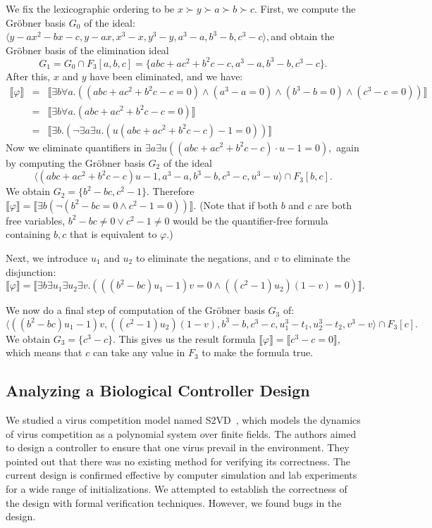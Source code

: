 \documentclass[envcountsect]{llncs}
\begin{document}
{{We fix the lexicographic ordering to be $x\succ y\succ a\succ b\succ c.$ First, we compute the Gr\"obner basis $G_0$ of the ideal: {$\langle y-ax^2-bx-c, y-ax, x^3-x,y^3-y,a^3-a,b^3-b,c^3-c\rangle,$}and obtain the Gr\"obner basis of the elimination ideal { $$G_1= G_0\cap F_3[a,b,c]=\{abc + ac^2 + b^2c - c, a^3-a, b^3 - b, c^3 - c\}.$$}After this, $x$ and $y$ have been eliminated, and we have:
 {\begin{eqnarray*}
\llbracket \varphi \rrbracket &= &\llbracket\exists b\forall a.((abc + ac^2 + b^2c - c=0)\wedge (a^3-a=0) \wedge (b^3 - b=0) \wedge (c^3 - c=0))\rrbracket\\
&=& \llbracket \exists b\forall a.(abc + ac^2 + b^2c - c=0)\rrbracket  \ \ \ \ \ \ \ \\
&=& \llbracket \exists b.(\neg \exists a \exists u.(u(abc + ac^2 + b^2c - c)-1=0))\rrbracket   
 \end{eqnarray*}}Now we eliminate quantifiers in $\exists a \exists u ((abc + ac^2 + b^2c - c)\cdot u-1=0),$ again by computing the Gr\"obner basis $G_2$ of the ideal {$$\langle (abc + ac^2 + b^2c - c)u-1,a^3-a,b^3-b,c^3-c,u^3-u\rangle \cap F_3[b,c].$$} We obtain $G_2=\{ b^2 - bc, c^2 - 1\}$. Therefore 
{$\llbracket \varphi \rrbracket = \llbracket \exists b (\neg (b^2 - bc=0\wedge c^2 - 1=0))\rrbracket$.} (Note that if both $b$ and $c$ are both free variables, $b^2 - bc\neq 0\vee c^2 - 1\neq 0$ would be the quantifier-free formula containing $b,c$ that is equivalent to $\varphi$.) 

Next, we introduce $u_1$ and $u_2$ to eliminate the negations, and $v$ to eliminate the disjunction: $$\llbracket\varphi\rrbracket = \llbracket\exists b \exists u_1\exists u_2\exists v.( ((b^2 - bc)u_1-1)v=0\wedge ((c^2-1)u_2)(1-v)=0)\rrbracket.$$

We now do a final step of computation of the Gr\"obner basis $G_3$ of:
{$$\langle ((b^2 - bc)u_1-1)v, ((c^2-1)u_2)(1-v),  b^3-b, c^3-c, u_1^3-t_1, u_2^3-t_2, v^3-v\rangle\cap F_3[c].$$}We obtain $G_3=\{c^3-c\}$. This gives us the result formula $\llbracket\varphi\rrbracket =\llbracket c^3-c=0\rrbracket,$ which means that $c$ can take any value in $F_3$ to make the formula true.
\subsection{Analyzing a Biological Controller Design}

We studied a virus competition model named S2VD~\cite{virus}, which models the dynamics of virus competition as a polynomial system over finite fields. The authors aimed to design a controller to ensure that one virus prevail in the environment. They pointed out that there was no existing method for verifying its correctness. The current design is confirmed effective by computer simulation and lab experiments for a wide range of initializations. We attempted to establish the correctness of the design with formal verification techniques. However, we found bugs in the design. 

}}
\end{document}
